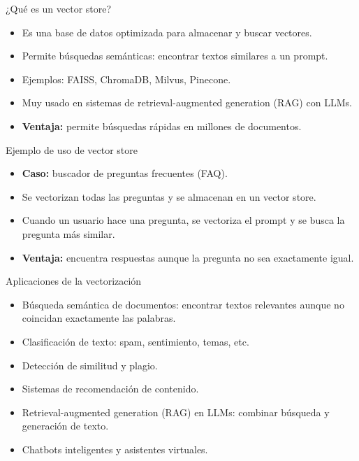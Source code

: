 \documentclass[aspectratio=169,xcolor=dvipsnames, t]{beamer}
\begin{document}
\begin{frame}{¿Qué es un vector store?}
    \begin{itemize}
        \item Es una base de datos optimizada para almacenar y buscar vectores.
        \item Permite búsquedas semánticas: encontrar textos similares a un prompt.
        \item Ejemplos: FAISS, ChromaDB, Milvus, Pinecone.
        \item Muy usado en sistemas de retrieval-augmented generation (RAG) con LLMs.
        \item \textbf{Ventaja:} permite búsquedas rápidas en millones de documentos.
    \end{itemize}
    \vspace{0.3cm}
    
\end{frame}

\begin{frame}{Ejemplo de uso de vector store}
    \begin{itemize}
        \item \textbf{Caso:} buscador de preguntas frecuentes (FAQ).
        \item Se vectorizan todas las preguntas y se almacenan en un vector store.
        \item Cuando un usuario hace una pregunta, se vectoriza el prompt y se busca la pregunta más similar.
        \item \textbf{Ventaja:} encuentra respuestas aunque la pregunta no sea exactamente igual.
    \end{itemize}
    \vspace{0.3cm}
    
\end{frame}

\begin{frame}{Aplicaciones de la vectorización}
    \begin{itemize}
        \item Búsqueda semántica de documentos: encontrar textos relevantes aunque no coincidan exactamente las palabras.
        \item Clasificación de texto: spam, sentimiento, temas, etc.
        \item Detección de similitud y plagio.
        \item Sistemas de recomendación de contenido.
        \item Retrieval-augmented generation (RAG) en LLMs: combinar búsqueda y generación de texto.
        \item Chatbots inteligentes y asistentes virtuales.
   
    \end{itemize}
\end{frame}
\end{document}
